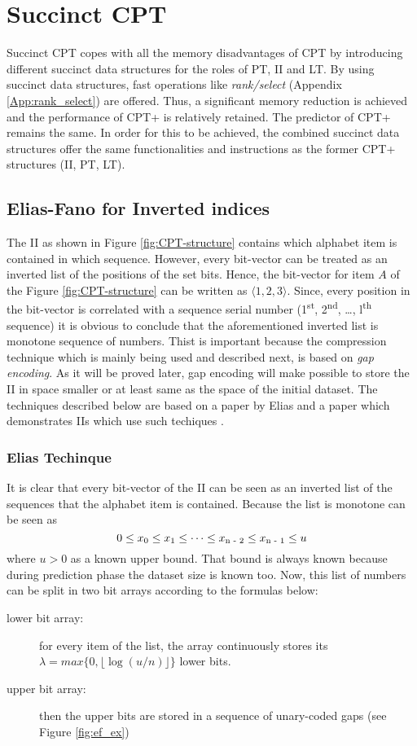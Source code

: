 \section{Succinct CPT}\label{ccpt}
Succinct CPT copes with all the memory disadvantages of CPT by introducing different succinct data structures for the roles of PT, II and LT. By using succinct data structures, fast operations like \emph{rank/select} (Appendix \ref{App:rank_select}) are offered. Thus, a significant memory reduction is achieved and the performance of CPT+ is relatively retained. The predictor of CPT+ remains the same. In order for this to be achieved, the combined succinct data structures offer the same functionalities and instructions as the former CPT+ structures (II, PT, LT).
\subsection{Elias-Fano for Inverted indices}\label{elicas_fano}
The II as shown in Figure \ref{fig:CPT-structure} contains which alphabet item is contained in which sequence. However, every bit-vector can be treated as an inverted list of the positions of the set bits. Hence, the bit-vector for item \(A\) of the Figure \ref{fig:CPT-structure} can be written as \(\langle 1, 2, 3\rangle\). Since, every position in the bit-vector is correlated with a sequence serial number (1\textsuperscript{st}, 2\textsuperscript{nd}, \dots, l\textsuperscript{th} sequence) it is obvious to conclude that the aforementioned inverted list is monotone sequence of numbers. Thist is important because  the compression technique which is mainly being used and described next, is based on \emph{gap encoding}. As it will be proved later, gap encoding will make possible to store the II in space smaller or at least same as the space of the initial dataset. The techniques described below are based on a paper by Elias \cite{elias_efficient_1974} and a paper which demonstrates IIs which use such techiques \cite{vigna_quasi-succinct_2013}.
\subsubsection*{Elias Techinque}
\par It is clear that every bit-vector of the II can be seen as an inverted list of the sequences that the alphabet item is contained. Because the list is monotone can be seen as \[0 \leq x\textsubscript{0} \leq x\textsubscript{1} \leq \dots \leq x\textsubscript{n - 2} \leq x\textsubscript{n - 1} \leq u \] where \(u > 0 \) as a known upper bound. That bound is always known because during prediction phase the dataset size is known too. Now, this list of numbers can be split in two bit arrays according to the formulas below:
	\begin{description}
  	\item[lower bit array:] for every item of the list, the array continuously stores its \( \lambda = max\{0, \lfloor \log(u/n)\rfloor\}\) lower bits.
  	\item[upper bit array:] then the upper bits are stored in a sequence of unary-coded gaps (see Figure \ref{fig:ef_ex})
	\end{description}


